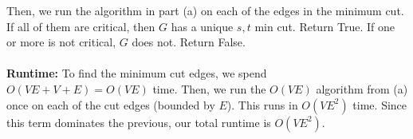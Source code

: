 \documentclass[11pt]{article}
\begin{document}
\begin{enumerate}[(a)]
\begin{solution}
Then, we run the algorithm in part (a) on each of the edges in the minimum cut. If all of them are critical, then $G$ has a unique $s,t$ min cut. Return True. If one or more is not critical, $G$ does not. Return False. \\ \\
\textbf{Runtime:} To find the minimum cut edges, we spend $O(VE+V+E)=O(VE)$ time. Then, we run the $O(VE)$ algorithm from (a) once on each of the cut edges (bounded by $E$). This runs in $O(VE^2)$ time. Since this term dominates the previous, our total runtime is $O(VE^2)$.
    \end{solution}
\end{enumerate}

\clearpage
\end{document}
